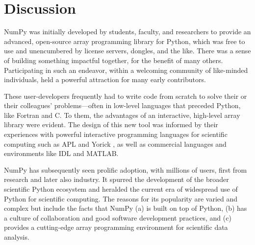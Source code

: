 

\section*{Discussion}

NumPy was initially developed by students, faculty, and researchers to
provide an advanced, open-source array programming library for Python,
which was free to use and unencumbered by license servers, dongles, and the like.
There was a sense of building something
impactful together, for the benefit of many others.  Participating in
such an endeavor, within a welcoming community of like-minded
individuals, held a powerful attraction for many early contributors.

These user-developers frequently had to write code from scratch to solve
their or their colleagues' problems---often in low-level languages
that preceded Python, like Fortran \cite{dongarra2008netlib} and C.
To them, the advantages of an interactive, high-level array library
were evident. The design of this new tool was informed by their
experiences with powerful interactive programming languages for
scientific computing such as APL \cite{iverson1962programming} and
Yorick \cite{munro1995using}, as well as commercial languages and
environments like IDL and {MATLAB}.

NumPy has subsequently seen prolific adoption, with millions of users,
first from research and later also industry.
It spurred the development of the broader scientific Python ecosystem and
heralded the current era of widespread use of Python for scientific computing.
The reasons for its popularity are varied and complex but include the facts that
NumPy (a) is built on top of Python,
(b) has a culture of collaboration and good software development practices, and
(c) provides a cutting-edge array programming environment for scientific data analysis.

